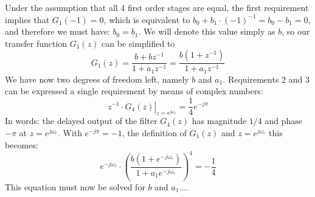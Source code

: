 Under the assumption that all 4 first order stages are equal, the first requirement implies that $G_1(-1)=0$, which is equivalent to $b_0 + b_1 \cdot (-1)^{-1} = b_0 - b_1 = 0$, and therefore we must have: $b_0 = b_1$. We will denote this value simply as $b$, so our transfer function $G_1(z)$ can be simplified to
\begin{equation}
\boxed
{
 G_1(z) = \frac{b + b z^{-1}}{1 + a_1 z^{-1}} = \frac{b (1 + z^{-1})}{1 + a_1 z^{-1}}
}
\end{equation}
We have now two degrees of freedom left, namely $b$ and $a_1$. Requirements 2 and 3 can be expressed a single requirement by means of complex numbers:
\begin{equation}
 \left. z^{-1} \cdot G_4(z) \right|_{z=e^{j \omega_c}} = \frac{1}{4} e^{-j \pi}
\end{equation}
In words: the delayed output of the filter $G_4(z)$ has magnitude $1/4$ and phase $-\pi$ at $z=e^{j \omega_c}$. With $e^{-j \pi} = -1$, the definition of $G_1(z)$ and $z=e^{j \omega_c}$ this becomes:
\begin{equation}
 e^{-j \omega_c} \cdot \left( \frac{b (1 + e^{-j \omega_c})}{1 + a_1 e^{-j \omega_c}} \right)^4  = - \frac{1}{4}
\end{equation}
This equation must now be solved for $b$ and $a_1$....

